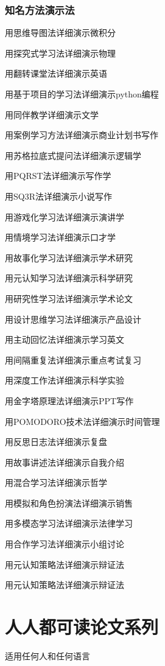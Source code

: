 \documentclass[12pt]{book}
\begin{document}
\subsection{知名方法演示法}

用思维导图法详细演示微积分



用探究式学习法详细演示物理


用翻转课堂法详细演示英语



用基于项目的学习法详细演示python编程


用同伴教学详细演示文学


用案例学习方法详细演示商业计划书写作


用苏格拉底式提问法详细演示逻辑学


用PQRST法详细演示写作学



用SQ3R法详细演示小说写作


用游戏化学习法详细演示演讲学


用情境学习法详细演示口才学


用故事化学习法详细演示学术研究


用元认知学习法详细演示科学研究



用研究性学习法详细演示学术论文


用设计思维学习法详细演示产品设计


用主动回忆法详细演示学习英文


用间隔重复法详细演示重点考试复习


用深度工作法详细演示科学实验


用金字塔原理法详细演示PPT写作



用POMODORO技术法详细演示时间管理


用反思日志法详细演示复盘


用故事讲述法详细演示自我介绍


用混合学习法详细演示哲学



用模拟和角色扮演法详细演示销售


用多模态学习法详细演示法律学习


用合作学习法详细演示小组讨论


用元认知策略法详细演示辩证法


用元认知策略法详细演示辩证法



\chapter{人人都可读论文系列}
适用任何人和任何语言
\end{document}
